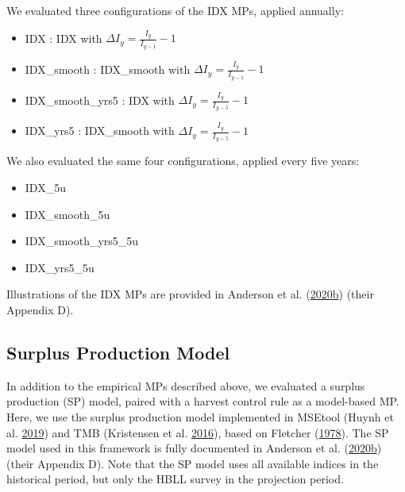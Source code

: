 \documentclass[11pt]{book}
\begin{document}
We evaluated three configurations of the IDX MPs, applied annually:
\begin{itemize}
\item
  IDX : IDX with \(\Delta I_y = \frac{I_y}{I_{y-1}} -1\)
\item
  IDX\_smooth : IDX\_smooth with \(\Delta I_y = \frac{I_y}{I_{y-1}} -1\)
\item
  IDX\_smooth\_yrs5 : IDX with \(\Delta I_y = \frac{I_y}{I_{y-5}} -1\)
\item
  IDX\_yrs5 : IDX\_smooth with \(\Delta I_y = \frac{I_y}{I_{y-5}} -1\)
\end{itemize}
We also evaluated the same four configurations, applied every five years:
\begin{itemize}
\item
  IDX\_5u
\item
  IDX\_smooth\_5u
\item
  IDX\_smooth\_yrs5\_5u
\item
  IDX\_yrs5\_5u
\end{itemize}
Illustrations of the IDX MPs are provided in Anderson et al. (\protect\hyperlink{ref-anderson2020gfmp}{2020}\protect\hyperlink{ref-anderson2020gfmp}{b}) (their Appendix D).

\hypertarget{sec:mp-model-based}{%
\label{sec:mp-model-based}}

\hypertarget{sec:mp-sp}{%
\subsection{Surplus Production Model}\label{sec:mp-sp}}

In addition to the empirical MPs described above, we evaluated a surplus production (SP) model, paired with a harvest control rule as a model-based MP. Here, we use the surplus production model implemented in MSEtool (Huynh et al. \protect\hyperlink{ref-huynh_msetool_2019}{2019}) and TMB (Kristensen et al. \protect\hyperlink{ref-tmb}{2016}), based on Fletcher (\protect\hyperlink{ref-fletcher1978}{1978}). The SP model used in this framework is fully documented in Anderson et al. (\protect\hyperlink{ref-anderson2020gfmp}{2020}\protect\hyperlink{ref-anderson2020gfmp}{b}) (their Appendix D). Note that the SP model uses all available indices in the historical period, but only the HBLL survey in the projection period.
\end{document}
